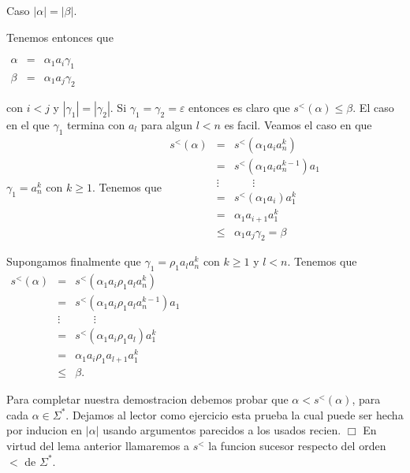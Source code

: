 Caso \(\left\vert \alpha \right\vert =\left\vert \beta \right\vert \).

Tenemos entonces que

\(\displaystyle \begin{array}{rcl} \alpha & =& \alpha _{1}a_{i}\gamma _{1} \\ \beta & =& \alpha _{1}a_{j}\gamma _{2} \end{array} \)

con \(i< j\) y \(\left\vert \gamma _{1}\right\vert =\left\vert \gamma _{2}\right\vert \). Si \(\gamma _{1}=\gamma _{2}=\varepsilon \) entonces es claro que \(s^{< }(\alpha )\leq \beta .\) El caso en el que \(\gamma _{1}\) termina con \(a_{l}\) para algun \(l< n\) es facil. Veamos el caso en que \(\gamma _{1}=a_{n}^{k}\) con \(k\geq 1.\) Tenemos que
\(\displaystyle \begin{array}{rcl} s^{< }(\alpha ) & = & s^{< }(\alpha _{1}a_{i}a_{n}^{k}) \\ & = & s^{< }(\alpha _{1}a_{i}a_{n}^{k-1})a_{1} \\ & \vdots & \;\;\;\;\;\;\vdots \\ & = & s^{< }(\alpha _{1}a_{i})a_{1}^{k} \\ & = & \alpha _{1}a_{i+1}a_{1}^{k} \\ & \leq & \alpha _{1}a_{j}\gamma _{2}=\beta \end{array} \)

Supongamos finalmente que \(\gamma _{1}=\rho _{1}a_{l}a_{n}^{k}\) con \(k\geq 1\) y \(l< n\). Tenemos que
\(\displaystyle \begin{array}{rcl} s^{< }(\alpha ) & = & s^{< }(\alpha _{1}a_{i}\rho _{1}a_{l}a_{n}^{k}) \\ & = & s^{< }(\alpha _{1}a_{i}\rho _{1}a_{l}a_{n}^{k-1})a_{1} \\ & \vdots & \;\;\;\;\;\;\vdots \\ & = & s^{< }(\alpha _{1}a_{i}\rho _{1}a_{l})a_{1}^{k} \\ & = & \alpha _{1}a_{i}\rho _{1}a_{l+1}a_{1}^{k} \\ & \leq & \beta . \end{array} \)

Para completar nuestra demostracion debemos probar que \(\alpha < s^{< }(\alpha )\), para cada \(\alpha \in \Sigma ^{\ast }\). Dejamos al lector como ejercicio esta prueba la cual puede ser hecha por inducion en \(\left\vert \alpha \right\vert \) usando argumentos parecidos a los usados recien. \(\Box\)
En virtud del lema anterior llamaremos a \(s^{< }\) la funcion sucesor respecto del orden \(< \) de \(\Sigma ^{\ast }\).


